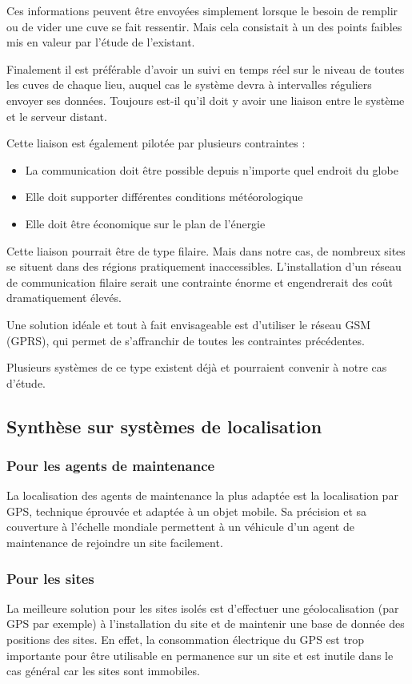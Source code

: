 \documentclass{mise_en_page}
\begin{document}
Ces informations peuvent être envoyées simplement lorsque le besoin de
remplir ou de vider une cuve se fait ressentir. Mais cela consistait à
un des points faibles mis en valeur par l’étude de l’existant.

Finalement il est préférable d’avoir un suivi en temps réel sur le
niveau de toutes les cuves de chaque lieu, auquel cas le système devra
à intervalles réguliers envoyer ses données. Toujours est-il qu’il doit
y avoir une liaison entre le système et le serveur distant. 

Cette liaison est également pilotée par plusieurs contraintes :

\begin{itemize}
\item La communication doit être possible depuis n’importe quel endroit
du globe
\item Elle doit supporter différentes conditions météorologique
\item Elle doit être économique sur le plan de l’énergie
\end{itemize}

Cette liaison pourrait être de type filaire. Mais dans notre cas, de
nombreux sites se situent dans des régions pratiquement inaccessibles.
L’installation d’un réseau de communication filaire serait une
contrainte énorme et engendrerait des coût dramatiquement élevés. 

Une solution idéale et tout à fait envisageable est d’utiliser le réseau
GSM (GPRS), qui permet de s’affranchir de toutes les contraintes
précédentes.

Plusieurs systèmes de ce type existent déjà et pourraient convenir à
notre cas d’étude.

\subsection{Synthèse sur systèmes de localisation}
\subsubsection{Pour les agents de maintenance}
La localisation des agents de maintenance la plus adaptée est la
localisation par GPS, technique éprouvée et adaptée à un objet mobile.
Sa précision et sa couverture à l’échelle mondiale permettent à un
véhicule d’un agent de maintenance de rejoindre un site facilement.

\subsubsection{Pour les sites}
La meilleure solution pour les sites isolés est d’effectuer une
géolocalisation (par GPS par exemple) à l’installation du site et de
maintenir une base de donnée des positions des sites. En effet, la
consommation électrique du GPS est trop importante pour être utilisable
en permanence sur un site et est inutile dans le cas général car les
sites sont immobiles.
\end{document}
